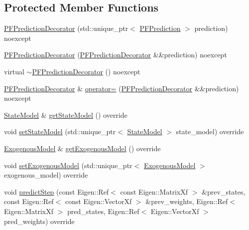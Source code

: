 \subsection*{Protected Member Functions}
\begin{DoxyCompactItemize}
\item 
\mbox{\hyperlink{classbfl_1_1PFPredictionDecorator_ab2b0e6cdba28a84750be81633a1a0d17}{P\+F\+Prediction\+Decorator}} (std\+::unique\+\_\+ptr$<$ \mbox{\hyperlink{classbfl_1_1PFPrediction}{P\+F\+Prediction}} $>$ prediction) noexcept
\item 
\mbox{\hyperlink{classbfl_1_1PFPredictionDecorator_a1d89c07579cf675ad4850716445e165e}{P\+F\+Prediction\+Decorator}} (\mbox{\hyperlink{classbfl_1_1PFPredictionDecorator}{P\+F\+Prediction\+Decorator}} \&\&prediction) noexcept
\item 
virtual \mbox{\hyperlink{classbfl_1_1PFPredictionDecorator_ae811b419d4ca5961f7e91528ffd44b3b}{$\sim$\+P\+F\+Prediction\+Decorator}} () noexcept
\item 
\mbox{\hyperlink{classbfl_1_1PFPredictionDecorator}{P\+F\+Prediction\+Decorator}} \& \mbox{\hyperlink{classbfl_1_1PFPredictionDecorator_ac5dcaf62987b0cd48f568373dcd71655}{operator=}} (\mbox{\hyperlink{classbfl_1_1PFPredictionDecorator}{P\+F\+Prediction\+Decorator}} \&\&prediction) noexcept
\item 
\mbox{\hyperlink{classbfl_1_1StateModel}{State\+Model}} \& \mbox{\hyperlink{classbfl_1_1PFPredictionDecorator_afad4d92333c84f909c41bd589b839113}{get\+State\+Model}} () override
\item 
void \mbox{\hyperlink{classbfl_1_1PFPredictionDecorator_ad269dfbdecf19d67717a8bc44f0bd286}{set\+State\+Model}} (std\+::unique\+\_\+ptr$<$ \mbox{\hyperlink{classbfl_1_1StateModel}{State\+Model}} $>$ state\+\_\+model) override
\item 
\mbox{\hyperlink{classbfl_1_1ExogenousModel}{Exogenous\+Model}} \& \mbox{\hyperlink{classbfl_1_1PFPredictionDecorator_a8d25d3765f642f7de1af897d088d8da9}{get\+Exogenous\+Model}} () override
\item 
void \mbox{\hyperlink{classbfl_1_1PFPredictionDecorator_a3c38ae386456ecd0fd1b609b381395ec}{set\+Exogenous\+Model}} (std\+::unique\+\_\+ptr$<$ \mbox{\hyperlink{classbfl_1_1ExogenousModel}{Exogenous\+Model}} $>$ exogenous\+\_\+model) override
\item 
void \mbox{\hyperlink{classbfl_1_1PFPredictionDecorator_af005f96b493e9ba72058613bbc7a8e43}{predict\+Step}} (const Eigen\+::\+Ref$<$ const Eigen\+::\+Matrix\+Xf $>$ \&prev\+\_\+states, const Eigen\+::\+Ref$<$ const Eigen\+::\+Vector\+Xf $>$ \&prev\+\_\+weights, Eigen\+::\+Ref$<$ Eigen\+::\+Matrix\+Xf $>$ pred\+\_\+states, Eigen\+::\+Ref$<$ Eigen\+::\+Vector\+Xf $>$ pred\+\_\+weights) override
\end{DoxyCompactItemize}
